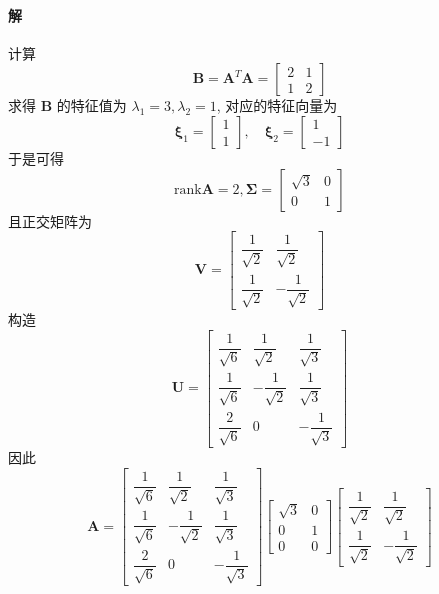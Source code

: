 \documentclass[12pt, a4paper, oneside, fontset=none]{ctexart}
\begin{document}
\paragraph*{解} 计算
$$
    \bm{B} = \bm{A}^T\bm{A} = \begin{bmatrix}
        2 & 1 \\
        1 & 2
    \end{bmatrix}
$$
求得 $\bm{B}$ 的特征值为 $\lambda_1 = 3, \lambda_2 = 1$, 对应的特征向量为
$$
    \bm{\xi}_1 = \begin{bmatrix}
        1 \\
        1
    \end{bmatrix}, \quad \bm{\xi}_2 = \begin{bmatrix}
        1 \\
        -1
    \end{bmatrix}
$$
于是可得
$$
    \mathrm{rank}\bm{A} = 2, \bm{\Sigma} = \begin{bmatrix}
        \sqrt{3} & 0 \\
        0        & 1
    \end{bmatrix}
$$
且正交矩阵为
$$
    \bm{V} = \begin{bmatrix}
        \dfrac{1}{\sqrt{2}} & \dfrac{1}{\sqrt{2}}  \\
        \dfrac{1}{\sqrt{2}} & -\dfrac{1}{\sqrt{2}}
    \end{bmatrix}
$$
构造
$$
    \bm{U} = \begin{bmatrix}
        \dfrac{1}{\sqrt{6}} & \dfrac{1}{\sqrt{2}}  & \dfrac{1}{\sqrt{3}}  \\
        \dfrac{1}{\sqrt{6}} & -\dfrac{1}{\sqrt{2}} & \dfrac{1}{\sqrt{3}}  \\
        \dfrac{2}{\sqrt{6}} & 0                    & -\dfrac{1}{\sqrt{3}}
    \end{bmatrix}
$$
因此
$$
    \bm{A} = \begin{bmatrix}
        \dfrac{1}{\sqrt{6}} & \dfrac{1}{\sqrt{2}}  & \dfrac{1}{\sqrt{3}}  \\
        \dfrac{1}{\sqrt{6}} & -\dfrac{1}{\sqrt{2}} & \dfrac{1}{\sqrt{3}}  \\
        \dfrac{2}{\sqrt{6}} & 0                    & -\dfrac{1}{\sqrt{3}}
    \end{bmatrix}\begin{bmatrix}
        \sqrt{3} & 0 \\
        0        & 1 \\
        0        & 0
    \end{bmatrix}\begin{bmatrix}
        \dfrac{1}{\sqrt{2}} & \dfrac{1}{\sqrt{2}}  \\
        \dfrac{1}{\sqrt{2}} & -\dfrac{1}{\sqrt{2}}
    \end{bmatrix}
$$
\end{document}
